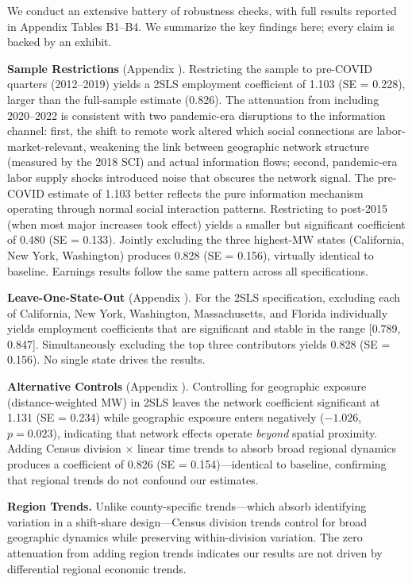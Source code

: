 \documentclass[12pt]{article}
\begin{document}
We conduct an extensive battery of robustness checks, with full results reported in Appendix Tables B1--B4. We summarize the key findings here; every claim is backed by an exhibit.

\textbf{Sample Restrictions} (Appendix ). Restricting the sample to pre-COVID quarters (2012--2019) yields a 2SLS employment coefficient of 1.103 (SE = 0.228), larger than the full-sample estimate (0.826). The attenuation from including 2020--2022 is consistent with two pandemic-era disruptions to the information channel: first, the shift to remote work altered which social connections are labor-market-relevant, weakening the link between geographic network structure (measured by the 2018 SCI) and actual information flows; second, pandemic-era labor supply shocks introduced noise that obscures the network signal. The pre-COVID estimate of 1.103 better reflects the pure information mechanism operating through normal social interaction patterns. Restricting to post-2015 (when most major increases took effect) yields a smaller but significant coefficient of 0.480 (SE = 0.133). Jointly excluding the three highest-MW states (California, New York, Washington) produces 0.828 (SE = 0.156), virtually identical to baseline. Earnings results follow the same pattern across all specifications.

\textbf{Leave-One-State-Out} (Appendix ). For the 2SLS specification, excluding each of California, New York, Washington, Massachusetts, and Florida individually yields employment coefficients that are significant and stable in the range [0.789, 0.847]. Simultaneously excluding the top three contributors yields 0.828 (SE = 0.156). No single state drives the results.

\textbf{Alternative Controls} (Appendix ). Controlling for geographic exposure (distance-weighted MW) in 2SLS leaves the network coefficient significant at 1.131 (SE = 0.234) while geographic exposure enters negatively ($-1.026$, $p = 0.023$), indicating that network effects operate \textit{beyond} spatial proximity. Adding Census division $\times$ linear time trends to absorb broad regional dynamics produces a coefficient of 0.826 (SE = 0.154)---identical to baseline, confirming that regional trends do not confound our estimates.

\textbf{Region Trends.} Unlike county-specific trends---which absorb identifying variation in a shift-share design---Census division trends control for broad geographic dynamics while preserving within-division variation. The zero attenuation from adding region trends indicates our results are not driven by differential regional economic trends.
\end{document}
